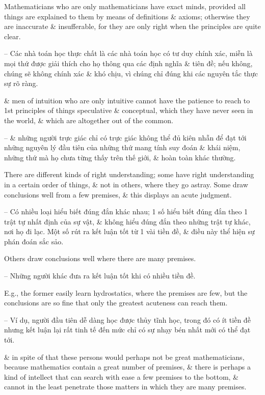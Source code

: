 \documentclass{article}
\begin{document}
\begin{enumerate}
\begin{itemize}
		Mathematicians who are only mathematicians have exact minds, provided all things are explained to them by means of definitions \& axioms; otherwise they are inaccurate \& insufferable, for they are only right when the principles are quite clear.
		
		-- Các nhà toán học thực chất là các nhà toán học có tư duy chính xác, miễn là mọi thứ được giải thích cho họ thông qua các định nghĩa \& tiên đề; nếu không, chúng sẽ không chính xác \& khó chịu, vì chúng chỉ đúng khi các nguyên tắc thực sự rõ ràng.
		
		\& men of intuition who are only intuitive cannot have the patience to reach to 1st principles of things speculative \& conceptual, which they have never seen in the world, \& which are altogether out of the common.
		
		-- \& những người trực giác chỉ có trực giác không thể đủ kiên nhẫn để đạt tới những nguyên lý đầu tiên của những thứ mang tính suy đoán \& khái niệm, những thứ mà họ chưa từng thấy trên thế giới, \& hoàn toàn khác thường.
		
		 There are different kinds of right understanding; some have right understanding in a certain order of things, \& not in others, where they go astray. Some draw conclusions well from a few premises, \& this displays an acute judgment.
		
		-- Có nhiều loại hiểu biết đúng đắn khác nhau; 1 số hiểu biết đúng đắn theo 1 trật tự nhất định của sự vật, \& không hiểu đúng đắn theo những trật tự khác, nơi họ đi lạc. Một số rút ra kết luận tốt từ 1 vài tiền đề, \& điều này thể hiện sự phán đoán sắc sảo.
		
		Others draw conclusions well where there are many premises.
		
		-- Những người khác đưa ra kết luận tốt khi có nhiều tiền đề.
		
		E.g., the former easily learn hydrostatics, where the premises are few, but the conclusions are so fine that only the greatest acuteness can reach them.
		
		-- Ví dụ, người đầu tiên dễ dàng học được thủy tĩnh học, trong đó có ít tiền đề nhưng kết luận lại rất tinh tế đến mức chỉ có sự nhạy bén nhất mới có thể đạt tới.
		
		\& in spite of that these persons would perhaps not be great mathematicians, because mathematics contain a great number of premises, \& there is perhaps a kind of intellect that can search with ease a few premises to the bottom, \& cannot in the least penetrate those matters in which they are many premises.
		

\end{itemize}
\end{enumerate}
\end{document}
